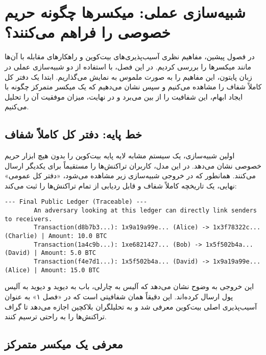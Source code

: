 \chapter{شبیه‌سازی عملی: میکسرها چگونه حریم خصوصی را فراهم می‌کنند؟}
\label{chap:mixer_simulation}

در فصول پیشین، مفاهیم نظری آسیب‌پذیری‌های بیت‌کوین و راهکارهای مقابله با آن‌ها مانند میکسرها را بررسی کردیم. در این فصل، با استفاده از دو شبیه‌سازی عملی در زبان پایتون، این مفاهیم را به صورت ملموس به نمایش می‌گذاریم\cite{lavafi_github_sim}. ابتدا یک دفتر کل کاملاً شفاف را مشاهده می‌کنیم و سپس نشان می‌دهیم که یک میکسر متمرکز چگونه با ایجاد ابهام، این شفافیت را از بین می‌برد و در نهایت، میزان موفقیت آن را تحلیل می‌کنیم.

\section{خط پایه: دفتر کل کاملاً شفاف}

اولین شبیه‌سازی، یک سیستم مشابه لایه پایه بیت‌کوین را بدون هیچ ابزار حریم خصوصی نشان می‌دهد. در این مدل، کاربران تراکنش‌ها را مستقیماً برای یکدیگر ارسال می‌کنند. همانطور که در خروجی شبیه‌سازی زیر مشاهده می‌شود، «دفتر کل عمومی» نهایی، یک تاریخچه کاملاً شفاف و قابل ردیابی از تمام تراکنش‌ها را ثبت می‌کند:

\begin{latin}
	\begin{lstlisting}[caption={خروجی شبیه‌سازی بدون میکسر}, label=list:no_mixer_output]
		--- Final Public Ledger (Traceable) ---
		An adversary looking at this ledger can directly link senders to receivers.
		Transaction(d8b7b3...): 1x9a19a99e... (Alice) -> 1x3f78322c... (Charlie) | Amount: 10.0 BTC
		Transaction(1a4c9b...): 1xe6821427... (Bob) -> 1x5f502b4a... (David) | Amount: 5.0 BTC
		Transaction(f4e7d1...): 1x5f502b4a... (David) -> 1x9a19a99e... (Alice) | Amount: 15.0 BTC
	\end{lstlisting}
\end{latin}

این خروجی به وضوح نشان می‌دهد که آلیس به چارلی، باب به دیوید و دیوید به آلیس پول ارسال کرده‌اند. این دقیقاً همان شفافیتی است که در «فصل ۱» به عنوان آسیب‌پذیری اصلی بیت‌کوین معرفی شد و به تحلیلگران بلاکچین اجازه می‌دهد تا گراف تراکنش‌ها را به راحتی ترسیم کنند.

\section{معرفی یک میکسر متمرکز}

